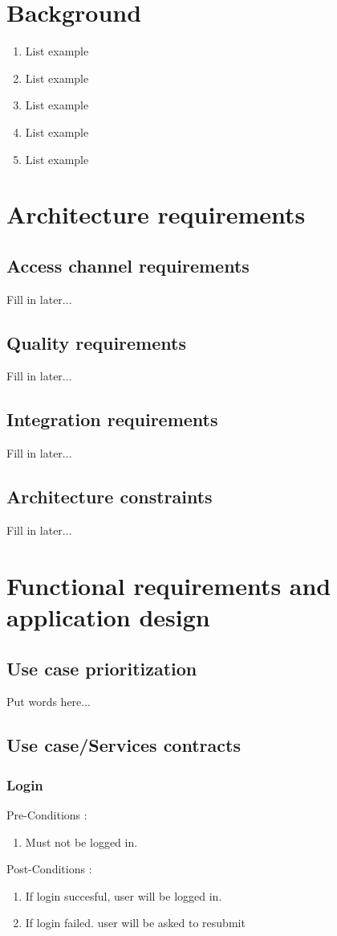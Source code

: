 \documentclass[12pt, oneside]{article}
\begin{document}
\section{Background}
	\begin{enumerate}
		\item List example
		\item List example
		\item List example
		\item List example
		\item List example
	\end{enumerate}
	
\section{Architecture requirements}
	\subsection{Access channel requirements}
		Fill in later...
	\subsection{Quality requirements}
		Fill in later...
	\subsection{Integration requirements}
		Fill in later...
	\subsection{Architecture constraints}
		Fill in later...
	
\section{Functional requirements and application design}
	\subsection{Use case prioritization}
		Put words here...
	\subsection{Use case/Services contracts}
			\subsubsection{Login}
				Pre-Conditions : \begin{enumerate}
							\item Must not be logged in.
						     \end{enumerate}
				Post-Conditions : \begin{enumerate}
							\item If login succesful, user will be logged in.
							\item If login failed. user will be asked to resubmit
						     \end{enumerate}
\end{document}
